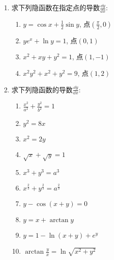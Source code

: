 \begin{ex}
\begin{enumerate}
    \item 求下列隐函数在指定点的导数$\frac{\dd y}{\dd x}$:
\begin{enumerate}
    \item $y=\cos x+\frac{1}{2}\sin y$, 点$\left(\frac{\pi}{2},0\right)$
    \item $ye^x+\ln y=1$, 点$\left(0,1\right)$
    \item $x^2+xy+y^2=1$, 点$\left(1,-1\right)$
    \item $x^2y^2+x^2+y^2=9$, 点$\left(1,2\right)$
\end{enumerate}
    \item 求下列隐函数的导数$\frac{\dd y}{\dd x}$:
\begin{multicols}{2}
\begin{enumerate}
    \item $\frac{x^2}{a^2}+\frac{y^2}{b^2}=1$
    \item $y^2=8x$
    \item $x^2=2y$
    \item $\sqrt{x}+\sqrt{y}=1$
    \item $x^3+y^3=a^3$
    \item $x^{\tfrac{2}{3}}+y^{\tfrac{2}{3}}=a^{\tfrac{2}{3}}$
    \item $y-\cos(x+y)=0$
    \item $y=x+\arctan y$
    \item $y=1-\ln(x+y)+e^y$
    \item $\arctan \frac{y}{x}=\ln\sqrt{x^2+y^2}$
\end{enumerate}
\end{multicols}


\end{enumerate}
\end{ex}
